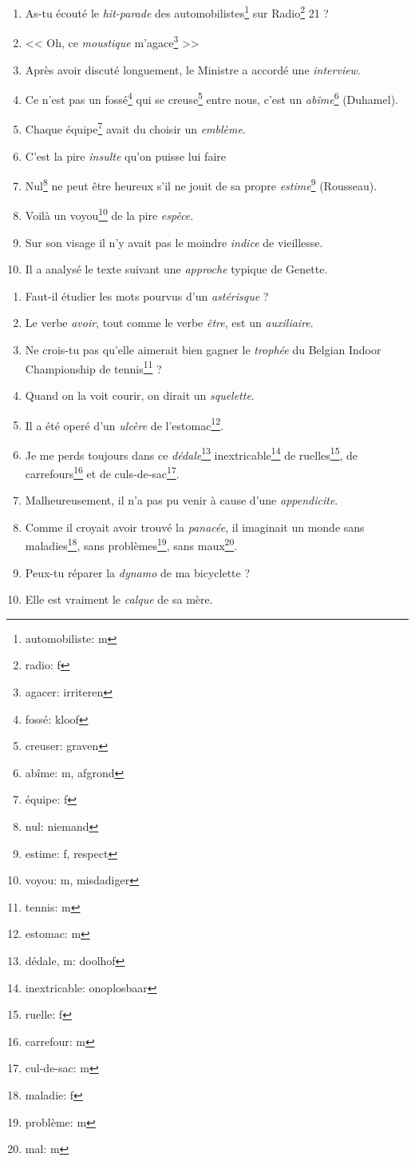 \documentclass[11pt, french]{report}
\begin{document}
\begin{enumerate}
\item As-tu écouté le \textit{hit-parade} des automobilistes\footnote{automobiliste: m} sur Radio\footnote{radio: f} 21 ?
\item << Oh, ce \textit{moustique} m'agace\footnote{agacer: irriteren} >>
\item Après avoir discuté longuement, le Ministre a accordé une \textit{interview}.
\item Ce n'est pas un fossé\footnote{fossé: kloof} qui se creuse\footnote{creuser: graven} entre nous, c'est un \textit{abîme}\footnote{abîme: m, afgrond} (Duhamel).
\item Chaque équipe\footnote{équipe: f} avait du choisir un \textit{emblème}.
\item C'est la pire \textit{insulte} qu'on puisse lui faire
\item Nul\footnote{nul: niemand} ne peut être heureux s'il ne jouit de sa propre \textit{estime}\footnote{estime: f, respect} (Rousseau).
\item Voilà un voyou\footnote{voyou: m, misdadiger} de la pire \textit{espèce}.
\item Sur son visage il n'y avait pas le moindre \textit{indice} de vieillesse.
\item Il a analysé  le texte suivant une \textit{approche} typique de Genette.
\end{enumerate}

\vfill

\begin{enumerate}
\item Faut-il étudier les mots pourvus d'un \textit{astérisque} ?
\item Le verbe \textit{avoir}, tout comme le verbe \textit{être}, est un \textit{auxiliaire}.
\item Ne crois-tu pas qu'elle aimerait bien gagner le \textit{trophée} du Belgian Indoor Championship de tennis\footnote{tennis: m} ?
\item Quand on la voit courir, on dirait un \textit{squelette}.
\item Il a été operé d'un \textit{ulcère} de l'estomac\footnote{estomac: m}.
\item Je me perds toujours dans ce \textit{dédale}\footnote{dédale, m: doolhof} inextricable\footnote{inextricable: onoplosbaar} de ruelles\footnote{ruelle: f}, de carrefours\footnote{carrefour: m} et de culs-de-sac\footnote{cul-de-sac: m}.
\item Malheureusement, il n'a pas pu venir à cause d'une \textit{appendicite}.
\item Comme il croyait avoir trouvé la \textit{panacée}, il imaginait un monde sans maladies\footnote{maladie: f}, sans problèmes\footnote{problème: m}, sans maux\footnote{mal: m}.
\item Peux-tu réparer la \textit{dynamo} de ma bicyclette ?
\item Elle est vraiment le \textit{calque} de sa mère.
\end{enumerate}
\end{document}
